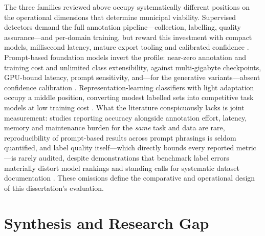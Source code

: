 The three families reviewed above occupy systematically different positions on the operational dimensions that determine municipal viability. Supervised detectors demand the full annotation pipeline---collection, labelling, quality assurance---and per-domain training, but reward this investment with compact models, millisecond latency, mature export tooling and calibrated confidence \citep{jocher2026yolo26,murshed2021machine}. Prompt-based foundation models invert the profile: near-zero annotation and training cost and unlimited class extensibility, against multi-gigabyte checkpoints, GPU-bound latency, prompt sensitivity, and---for the generative variants---absent confidence calibration \citep{meta2025sam3,nvidia2025cosmosreason2}. Representation-learning classifiers with light adaptation occupy a middle position, converting modest labelled sets into competitive task models at low training cost \citep{hu2022lora,oquab2024dinov2}. What the literature conspicuously lacks is joint measurement: studies reporting accuracy alongside annotation effort, latency, memory and maintenance burden for the \emph{same} task and data are rare, reproducibility of prompt-based results across prompt phrasings is seldom quantified, and label quality itself---which directly bounds every reported metric---is rarely audited, despite demonstrations that benchmark label errors materially distort model rankings \citep{northcutt2021pervasive} and standing calls for systematic dataset documentation \citep{gebru2021datasheets}. These omissions define the comparative and operational design of this dissertation's evaluation.

\section{Synthesis and Research Gap}
\label{sec:lr-gap}

